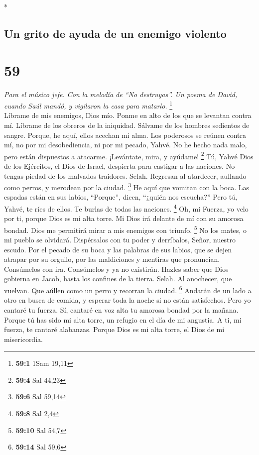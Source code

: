 \begin{paracol}{2}
\begin{otherlanguage}{english}
\end{otherlanguage}

\switchcolumn[0]*

\hypertarget{un-grito-de-ayuda-de-un-enemigo-violento}{%
\subsection{Un grito de ayuda de un enemigo
violento}\label{un-grito-de-ayuda-de-un-enemigo-violento}}

\hypertarget{section-116}{%
\section{59}\label{section-116}}

\emph{Para el músico jefe. Con la melodía de ``No destruyas''. Un poema
de David, cuando Saúl mandó, y vigilaron la casa para matarlo.}
\footnote{\textbf{59:1} 1Sam 19,11}\\
 Líbrame de mis enemigos, Dios mío. Ponme en alto de los
que se levantan contra mí.  Líbrame de los obreros de la
iniquidad. Sálvame de los hombres sedientos de sangre. 
Porque, he aquí, ellos acechan mi alma. Los poderosos se reúnen contra
mí, no por mi desobediencia, ni por mi pecado, Yahvé.  No
he hecho nada malo, pero están dispuestos a atacarme. ¡Levántate, mira,
y ayúdame! \footnote{\textbf{59:4} Sal 44,23}  Tú, Yahvé
Dios de los Ejércitos, el Dios de Israel, despierta para castigar a las
naciones. No tengas piedad de los malvados traidores. Selah.
 Regresan al atardecer, aullando como perros, y merodean
por la ciudad. \footnote{\textbf{59:6} Sal 59,14}  He aquí
que vomitan con la boca. Las espadas están en sus labios, ``Porque'',
dicen, ``¿quién nos escucha?''  Pero tú, Yahvé, te ríes de
ellos. Te burlas de todas las naciones. \footnote{\textbf{59:8} Sal 2,4}
 Oh, mi Fuerza, yo velo por ti, porque Dios es mi alta
torre.  Mi Dios irá delante de mí con su amorosa bondad.
Dios me permitirá mirar a mis enemigos con triunfo. \footnote{\textbf{59:10}
  Sal 54,7}  No los mates, o mi pueblo se olvidará.
Dispérsalos con tu poder y derríbalos, Señor, nuestro escudo.
 Por el pecado de su boca y las palabras de sus labios,
que se dejen atrapar por su orgullo, por las maldiciones y mentiras que
pronuncian.  Consúmelos con ira. Consúmelos y ya no
existirán. Hazles saber que Dios gobierna en Jacob, hasta los confines
de la tierra. Selah.  Al anochecer, que vuelvan. Que
aúllen como un perro y recorran la ciudad. \footnote{\textbf{59:14} Sal
  59,6}  Andarán de un lado a otro en busca de comida, y
esperar toda la noche si no están satisfechos.  Pero yo
cantaré tu fuerza. Sí, cantaré en voz alta tu amorosa bondad por la
mañana. Porque tú has sido mi alta torre, un refugio en el día de mi
angustia.  A ti, mi fuerza, te cantaré alabanzas. Porque
Dios es mi alta torre, el Dios de mi misericordia.


\end{paracol}
